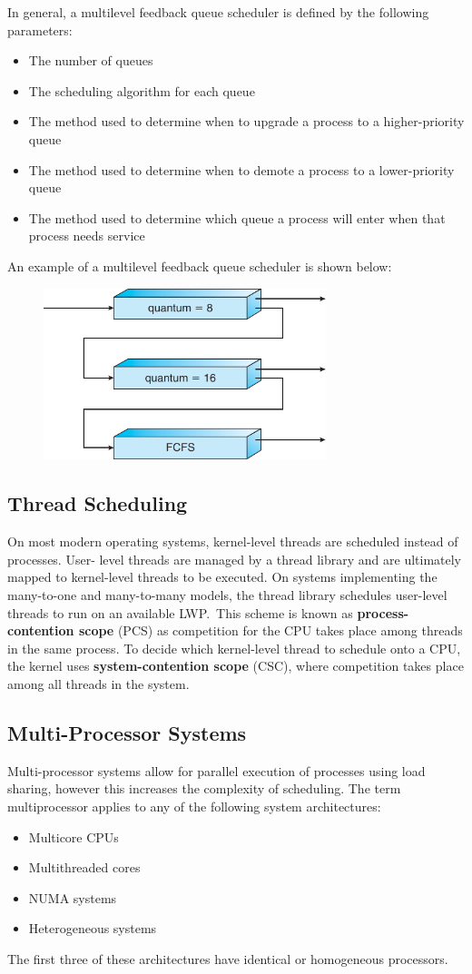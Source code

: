 \documentclass{article}
\begin{document}
In general, a multilevel feedback queue scheduler is defined by the
following parameters:
\begin{itemize}
    \item The number of queues
    \item The scheduling algorithm for each queue
    \item The method used to determine when to upgrade a process to a
          higher-priority queue
    \item The method used to determine when to demote a process to a
          lower-priority queue
    \item The method used to determine which queue a process will enter
          when that process needs service
\end{itemize}
An example of a multilevel feedback queue scheduler is shown below:
\begin{figure}[H]
    \centering
    \includegraphics[height = 5cm]{figures/multiple_feedback_queue_scheduling.pdf}
\end{figure}
\subsection{Thread Scheduling}
On most modern operating systems, kernel-level threads are scheduled
instead of processes. User- level threads are managed by a thread
library and are ultimately mapped to kernel-level threads to be
executed. On systems implementing the many-to-one and many-to-many
models, the thread library schedules user-level threads to run on an
available LWP.\ This scheme is known as \linebreak
\textbf{process-contention scope} (PCS) as competition for the CPU
takes place among threads in the same process. To decide which
kernel-level thread to schedule onto a CPU, the kernel uses
\textbf{system-contention scope} (CSC), where competition takes place
among all threads in the system.
\subsection{Multi-Processor Systems}
Multi-processor systems allow for parallel execution of processes using
load sharing, however this increases the complexity of scheduling. The
term multiprocessor applies to any of the following system
architectures:
\begin{itemize}
    \item Multicore CPUs
    \item Multithreaded cores
    \item NUMA systems
    \item Heterogeneous systems
\end{itemize}
The first three of these architectures have identical or homogeneous
processors.
\end{document}
